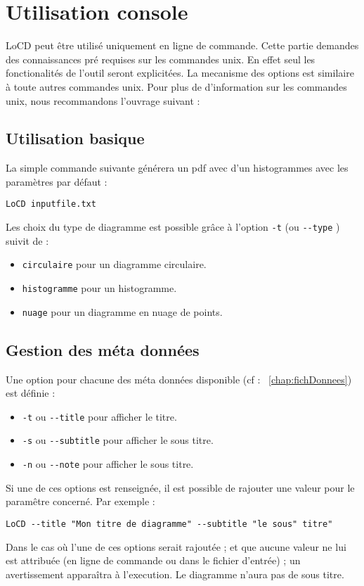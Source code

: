 \chapter{Utilisation console}
 
LoCD peut être utilisé uniquement en ligne de commande. Cette partie demandes des connaissances pré requises sur les commandes unix. En effet seul les fonctionalités de l'outil seront explicitées. La mecanisme des options est similaire à toute autres commandes unix. Pour plus de d'information sur les commandes unix, nous recommandons l'ouvrage suivant : \cite{linux}
\section{Utilisation basique}
\label{sec:usebas}
La simple commande suivante générera un pdf avec d'un histogrammes avec les paramètres par défaut : %
\begin{verbatim}LoCD inputfile.txt\end{verbatim}Les choix du type de diagramme est possible grâce à l'option \verb+-t+ (ou \verb+--type+ ) suivit de : 
\begin{itemize}
\item
\verb+circulaire+ pour un diagramme circulaire.
\item
\verb+histogramme+ pour un histogramme.
\item
\verb+nuage+ pour un diagramme en nuage de points.
\end{itemize}
\section{Gestion des méta données}
Une option pour chacune des méta données disponible (cf : ~\ref{chap:fichDonnees}) est définie :
\begin{itemize}
\item
\verb+-t+ ou \verb+--title+ pour afficher le titre.
\item
\verb+-s+ ou \verb+--subtitle+ pour afficher le sous titre.
\item
\verb+-n+ ou \verb+--note+ pour afficher le sous titre.
\end{itemize}
Si une de ces options est renseignée, il est possible de rajouter une valeur pour le paramêtre concerné. Par exemple : 
\begin{verbatim}
LoCD --title "Mon titre de diagramme" --subtitle "le sous" titre"
\end{verbatim} 
Dans le cas où l'une de ces options serait rajoutée ; et que aucune valeur ne lui est attribuée (en ligne de commande ou dans le fichier d'entrée) ; un avertissement apparaîtra à l'execution. Le diagramme n'aura pas de sous titre.\label{err:optmissing} %

